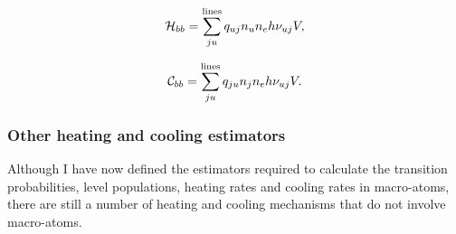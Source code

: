 \begin{equation}
{\cal H}_{bb} = \sum_{ju}^{\mathrm{lines}} q_{uj} n_u n_e h \nu_{uj} V,
\end{equation}


\begin{equation}
{\cal C}_{bb} = \sum_{ju}^{\mathrm{lines}} q_{ju} n_j n_e h \nu_{uj} V.
\end{equation}

\subsubsection{Other heating and cooling estimators}
Although I have now defined the estimators required to calculate the 
transition probabilities, level populations, heating rates and cooling rates in macro-atoms, 
there are still a number of heating and cooling mechanisms that do not involve macro-atoms. 

